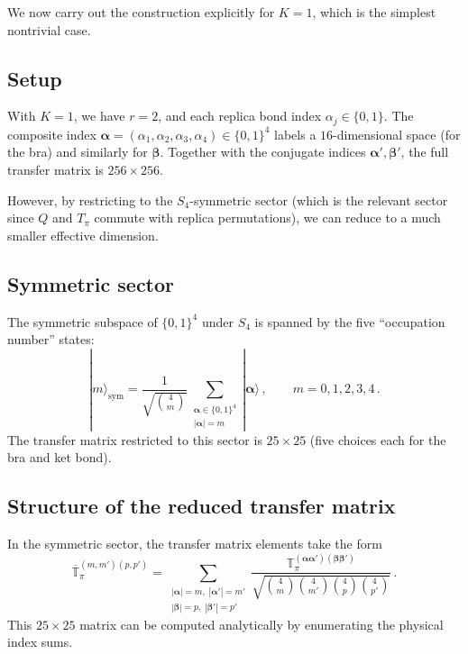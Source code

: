 \documentclass[11pt,a4paper]{article}
\theoremstyle{definition}
\theoremstyle{remark}
\begin{document}
We now carry out the construction explicitly for $K=1$, which is the simplest nontrivial case.

\subsection{Setup}

With $K=1$, we have $r=2$, and each replica bond index $\alpha_j\in\{0,1\}$. The composite index $\boldsymbol{\alpha}=(\alpha_1,\alpha_2,\alpha_3,\alpha_4)\in\{0,1\}^4$ labels a $16$-dimensional space (for the bra) and similarly for $\boldsymbol{\beta}$. Together with the conjugate indices $\boldsymbol{\alpha}', \boldsymbol{\beta}'$, the full transfer matrix is $256\times 256$.

However, by restricting to the $S_4$-symmetric sector (which is the relevant sector since $Q$ and $T_\pi$ commute with replica permutations), we can reduce to a much smaller effective dimension.

\subsection{Symmetric sector}

The symmetric subspace of $\{0,1\}^4$ under $S_4$ is spanned by the five ``occupation number'' states:
\begin{equation}
  |m\rangle_{\mathrm{sym}} = \frac{1}{\sqrt{\binom{4}{m}}}
  \sum_{\substack{\boldsymbol{\alpha}\in\{0,1\}^4\\|\boldsymbol{\alpha}|=m}} |\boldsymbol{\alpha}\rangle\,,
  \qquad m=0,1,2,3,4\,.
\end{equation}
The transfer matrix restricted to this sector is $25\times 25$ (five choices each for the bra and ket bond).

\subsection{Structure of the reduced transfer matrix}

In the symmetric sector, the transfer matrix elements take the form
\begin{equation}
  \overline{\mathbb{T}}_\pi^{(m,m')(p,p')}
  = \sum_{\substack{|\boldsymbol{\alpha}|=m,\;|\boldsymbol{\alpha}'|=m'\\|\boldsymbol{\beta}|=p,\;|\boldsymbol{\beta}'|=p'}}
  \frac{\mathbb{T}_\pi^{(\boldsymbol{\alpha}\boldsymbol{\alpha}')(\boldsymbol{\beta}\boldsymbol{\beta}')}}
  {\sqrt{\binom{4}{m}\binom{4}{m'}\binom{4}{p}\binom{4}{p'}}}\,.
\end{equation}
This $25\times 25$ matrix can be computed analytically by enumerating the physical index sums.
\end{document}
